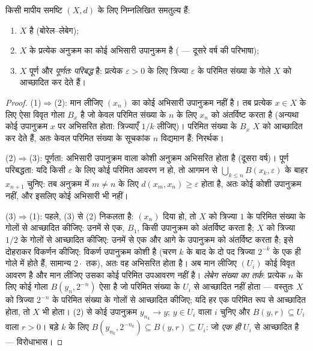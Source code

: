 \begin{theorem}
\label{thm:b3:topology:metriccompact}
किसी मापीय समष्टि $(X, d)$ के लिए निम्नलिखित समतुल्य
हैं:
\begin{enumerate}
  \item $X$  है (बोरेल--लेबेग);
  \item $X$ के प्रत्येक अनुक्रम का कोई अभिसारी उपानुक्रम है
        ( --- दूसरे वर्ष की परिभाषा);
  \item $X$ पूर्ण और \emph{पूर्णतः परिबद्ध} है: प्रत्येक $\varepsilon > 0$
        के लिए त्रिज्या $\varepsilon$ के परिमित संख्या के गोले $X$ को
        आच्छादित कर देते हैं।
\end{enumerate}
\end{theorem}

\begin{proof}
(1)$\Rightarrow$(2): मान लीजिए $(x_n)$ का कोई अभिसारी उपानुक्रम नहीं है। तब
प्रत्येक $x \in X$ के लिए ऐसा विवृत गोला $B_x$ है जो केवल परिमित
संख्या के $n$ के लिए $x_n$ को अंतर्विष्ट करता है (अन्यथा कोई
उपानुक्रम $x$ पर अभिसरित होता: त्रिज्याएँ $1/k$ लीजिए)। परिमित
संख्या के $B_x$ $X$ को आच्छादित कर देते हैं, अतः केवल परिमित
संख्या के सूचकांक $n$ विद्यमान हैं: निरर्थक।

(2)$\Rightarrow$(3): पूर्णता: अभिसारी उपानुक्रम वाला कोशी अनुक्रम अभिसरित
होता है (दूसरा वर्ष)। पूर्ण परिबद्धता: यदि किसी $\varepsilon$ के लिए कोई
परिमित आवरण न हो, तो आगमन से $\bigcup_{k\leq n} B(x_k, \varepsilon)$ के बाहर $x_{n+1}$ चुनिए: तब
अनुक्रम में $m \neq n$ के लिए $d(x_m, x_n) \geq \varepsilon$ होता है, अतः कोई कोशी उपानुक्रम
नहीं, और इसलिए कोई अभिसारी भी नहीं।

(3)$\Rightarrow$(1): पहले, (3) से (2) निकलता है: $(x_n)$ दिया हो, तो $X$
को त्रिज्या $1$ के परिमित संख्या के गोलों से आच्छादित कीजिए:
उनमें से एक, $B_1$, किसी उपानुक्रम को अंतर्विष्ट करता है; $X$
को त्रिज्या $1/2$ के गोलों से आच्छादित कीजिए: उनमें से एक और
आगे के उपानुक्रम को अंतर्विष्ट करता है; इसे दोहराकर विकर्णन
कीजिए: विकर्ण उपानुक्रम कोशी है (चरण $k$ के बाद के दो पद
त्रिज्या $2^{-k}$ के एक ही गोले में होते हैं, सामान्य $2\cdot$ तक),
अतः वह अभिसरित होता है। अब मान लीजिए $(U_i)$ कोई विवृत आवरण है और
मान लीजिए उसका कोई परिमित उपआवरण नहीं है। \emph{लेबेग संख्या का
तर्क}: प्रत्येक $n$ के लिए कोई गोला $B(y_n, 2^{-n})$ ऐसा है जो परिमित
संख्या के $U_i$ से आच्छादित नहीं होता --- वस्तुतः $X$ को
त्रिज्या $2^{-n}$ के परिमित संख्या के गोलों से आच्छादित कीजिए; यदि
हर एक परिमित रूप से आच्छादित होता, तो $X$ भी होता। (2) से कोई
उपानुक्रम $y_{n_k} \to y$; $y \in U_i$ वाला $i$ चुनिए और $B(y, r) \subseteq U_i$ वाला $r > 0$।
बड़े $k$ के लिए $B(y_{n_k}, 2^{-n_k}) \subseteq B(y, r) \subseteq U_i$: जो \emph{एक ही} $U_i$ से आच्छादित है ---
विरोधाभास।
\end{proof}

